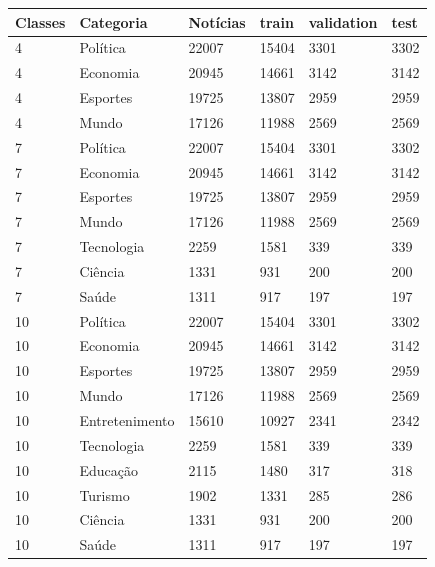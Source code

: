\begin{tabular}{llllll}
\hline
Classes & Categoria & Notícias & train & validation & test \\
\hline
4 & Política & 22007 & 15404 & 3301 & 3302 \\
4 & Economia & 20945 & 14661 & 3142 & 3142 \\
4 & Esportes & 19725 & 13807 & 2959 & 2959 \\
4 & Mundo & 17126 & 11988 & 2569 & 2569 \\
7 & Política & 22007 & 15404 & 3301 & 3302 \\
7 & Economia & 20945 & 14661 & 3142 & 3142 \\
7 & Esportes & 19725 & 13807 & 2959 & 2959 \\
7 & Mundo & 17126 & 11988 & 2569 & 2569 \\
7 & Tecnologia & 2259 & 1581 & 339 & 339 \\
7 & Ciência & 1331 & 931 & 200 & 200 \\
7 & Saúde & 1311 & 917 & 197 & 197 \\
10 & Política & 22007 & 15404 & 3301 & 3302 \\
10 & Economia & 20945 & 14661 & 3142 & 3142 \\
10 & Esportes & 19725 & 13807 & 2959 & 2959 \\
10 & Mundo & 17126 & 11988 & 2569 & 2569 \\
10 & Entretenimento & 15610 & 10927 & 2341 & 2342 \\
10 & Tecnologia & 2259 & 1581 & 339 & 339 \\
10 & Educação & 2115 & 1480 & 317 & 318 \\
10 & Turismo & 1902 & 1331 & 285 & 286 \\
10 & Ciência & 1331 & 931 & 200 & 200 \\
10 & Saúde & 1311 & 917 & 197 & 197 \\
\hline
\end{tabular}
